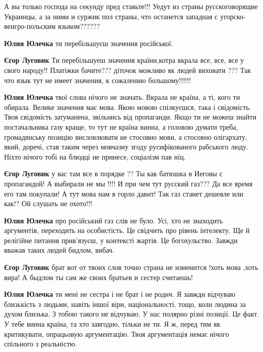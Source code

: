 \begin{itemize}
А вы только господа на секунду пред ставьте!!! Уедут из страны русскоговорящие
Украинцы, а за ними и суржик пол страны, что останется западная с
угорско-венгро-польским языком??????

\begin{itemize}
\textbf{Юлия Юлечка} ти перебільшуєш значення російської.

\textbf{Єгор Луговик} Ти перебільшуеш значення країни,котра вкрала все, все, все у свого народу!!
Платіжки бачите??? діточок можливо як людей виховати ???
Так что язык тут не имеет значения, к сожалению большому!!!!!!

\textbf{Юлия Юлечка} твої слова нічого не значать. Вкрала не країна, а ті, кого ти обирала. Велике значення має мова. Якою мовою спілкуєшся, така і свідомість. Твоя свідомість затуманена, звільнись від пропаганди. Якщо ти не можеш знайти постачальника газу краще, то тут не країна винна, а головою думати треба, громадянську позицію висловлювати не стосовно мови, а стосовно олігархату, який, доречі, став таким через мовчазну згоду русифікованого рабського люду. Ніхто нічого тобі на блюдці не принесе, соціалізм пав ніц.

\textbf{Єгор Луговик} у вас там все в порядке ??
Ты как батюшка в Иеговы с пропагандой!
А выбирали не мы !!!!
И при чем тут русский газ???
Да все время его там покупали!
А тут мова нам в горло давит!
Так газ станет дешевле или как!?
Ой слушать не охото!!!

\textbf{Юлия Юлечка} про російський газ слів не було. Усі, хто не знаходить
аргументів, переходить на особистість. Це свідчить про рівень інтелекту. Ще й
релігійне питання прив'язуєш, у контексті жартів. Це богохульство. Завжди
вважав таких людей бидлом, вибач.

\textbf{Єгор Луговик} брат вот от твоих слов точно страна не изменится !хоть
мова ,хоть вира!  А быдлом ты сам же своих братьев и сестер считаешь!

\textbf{Юлия Юлечка} ти мені не сестра і не брат і не родич. Я завжди відчуваю
близькість з людьми, навіть іншої віри, національності, тощо, коли людина за
духом близька. З тобою такого не відчуваю. У нас полярно різні позиції. Це
факт. У тебе винна країна, та хто завгодно, тільки не ти. Я ж, перед тим як
критикувати, опрацьовую аргументацію. Твоя аргументація немає нічого спільного
з реальністю.


\end{itemize}
\end{itemize}
